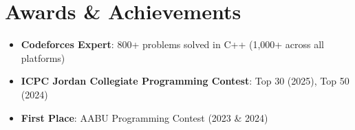 \documentclass[letterpaper,11pt]{article}
\newcommand{\resumeItem}[1]{
  \item\small{
    {#1 \vspace{-2pt}}
  }
}
\newcommand{\resumeSubHeadingListStart}{\begin{itemize}[leftmargin=0.15in, label={}]}
\newcommand{\resumeSubHeadingListEnd}{\end{itemize}}
\begin{document}
\section{Awards \& Achievements}
 \resumeSubHeadingListStart
    \resumeItem{\textbf{Codeforces Expert}: 800+ problems solved in C++ (1,000+ across all platforms)}
    \resumeItem{\textbf{ICPC Jordan Collegiate Programming Contest}: Top 30 (2025), Top 50 (2024)}
    \resumeItem{\textbf{First Place}: AABU Programming Contest (2023 \& 2024)}
 \resumeSubHeadingListEnd
\end{document}

